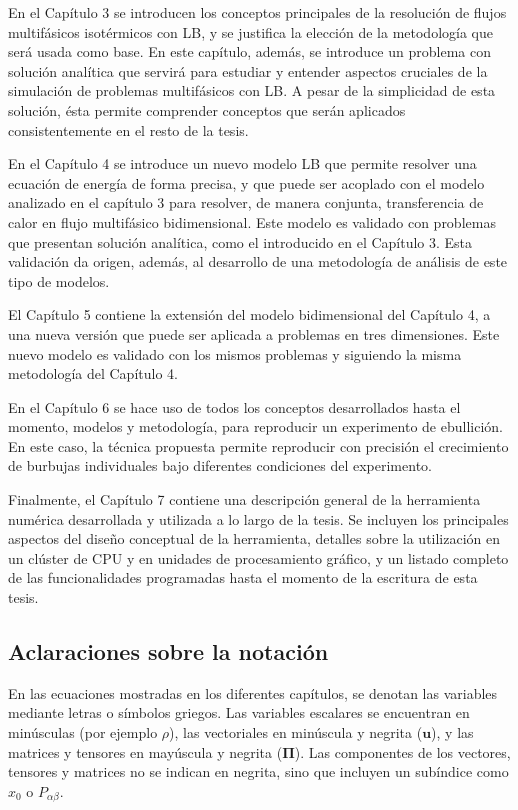 En el Cap\'itulo 3 se introducen los conceptos principales de la resoluci\'on de flujos multif\'asicos isot\'ermicos con LB, y se justifica la elecci\'on de la metodolog\'ia que ser\'a usada como base. En este cap\'itulo, adem\'as, se introduce un problema con soluci\'on anal\'itica que servir\'a para estudiar y entender aspectos cruciales de la simulaci\'on de problemas multif\'asicos con LB. A pesar de la simplicidad de esta soluci\'on, \'esta permite comprender conceptos que ser\'an aplicados consistentemente en el resto de la tesis.

En el Cap\'itulo 4 se introduce un nuevo modelo LB que permite resolver una ecuaci\'on de energ\'ia de forma precisa, y que puede ser acoplado con el modelo analizado en el cap\'itulo 3 para resolver, de manera conjunta, transferencia de calor en flujo multif\'asico bidimensional. Este modelo es validado con problemas que presentan soluci\'on anal\'itica, como el introducido en el Cap\'itulo 3. Esta validaci\'on da origen, adem\'as, al desarrollo de una metodolog\'ia de an\'alisis de este tipo de modelos.

El Cap\'itulo 5 contiene la extensi\'on del modelo bidimensional del Cap\'itulo 4, a una nueva versi\'on que puede ser aplicada a problemas en tres dimensiones. Este nuevo modelo es validado con los mismos problemas y siguiendo la misma metodolog\'ia del Cap\'itulo 4.

En el Cap\'itulo 6 se hace uso de todos los conceptos desarrollados hasta el momento, modelos y metodolog\'ia, para reproducir un experimento de ebullici\'on. En este caso, la t\'ecnica propuesta permite reproducir con precisi\'on el crecimiento de burbujas individuales bajo diferentes condiciones del experimento.

Finalmente, el Cap\'itulo 7 contiene una descripci\'on general de la herramienta num\'erica desarrollada y utilizada a lo largo de la tesis. Se incluyen los principales aspectos del dise\~no conceptual de la herramienta, detalles sobre la utilizaci\'on en un cl\'uster de CPU y en unidades de procesamiento gr\'afico, y un listado completo de las funcionalidades programadas hasta el momento de la escritura de esta tesis.



\subsection{Aclaraciones sobre la notaci\'on}

En las ecuaciones mostradas en los diferentes cap\'itulos, se denotan las variables mediante letras o s\'imbolos griegos. Las variables escalares se encuentran en min\'usculas (por ejemplo $\rho$), las vectoriales en min\'uscula y negrita ($\bm{u}$), y las matrices y tensores en may\'uscula y negrita ($\bm{\Pi}$). Las componentes de los vectores, tensores y matrices no se indican en negrita, sino que incluyen un sub\'indice como $x_0$ o $P_{\alpha\beta}$.

